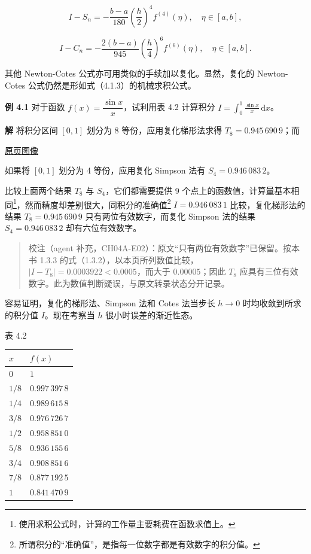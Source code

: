 \documentclass[
  10pt,
  fontset=fandol]{ctexart}
\newcounter{none} %
\begin{document}
\[
I-S_n=-\frac{b-a}{180}\left(\frac h2\right)^4f^{(4)}(\eta),\quad\eta\in[a,b],
\tag{4.2.13}
\]

\[
I-C_n=-\frac{2(b-a)}{945}\left(\frac h4\right)^6f^{(6)}(\eta),\quad\eta\in[a,b].
\tag{4.2.14}
\]

其他 Newton-Cotes 公式亦可用类似的手续加以复化。显然，复化的 Newton-Cotes 公式仍然是形如式（4.1.3）的机械求积公式。

\textbf{例 4.1} 对于函数 \(f(x)=\dfrac{\sin x}{x}\)，试利用表 4.2 计算积分 \(I=\displaystyle\int_0^1\frac{\sin x}{x}\,\mathrm{d}x\)。

\textbf{解} 将积分区间 \([0,1]\) 划分为 8 等份，应用复化梯形法求得 \(T_8=0.945\,690\,9\)；而

\href{../../source-images/pdf-100.jpeg}{原页图像}

如果将 \([0,1]\) 划分为 4 等份，应用复化 Simpson 法有 \(S_4=0.946\,083\,2\)。

比较上面两个结果 \(T_8\) 与 \(S_4\)，它们都需要提供 9 个点上的函数值，计算量基本相同\footnote{使用求积公式时，计算的工作量主要耗费在函数求值上。}，然而精度却差别很大，同积分的准确值\footnote{所谓积分的``准确值''，是指每一位数字都是有效数字的积分值。} \(I=0.946\,083\,1\) 比较，复化梯形法的结果 \(T_8=0.945\,690\,9\) 只有两位有效数字，而复化 Simpson 法的结果 \(S_4=0.946\,083\,2\) 却有六位有效数字。

\begin{quote}
校注（agent 补充，CH04A-E02）：原文``只有两位有效数字''已保留。按本书 1.3.3 的式（1.3.2），以本页所列数值比较，\(|I-T_8|=0.0003922<0.0005\)，而大于 \(0.00005\)；因此 \(T_8\) 应具有三位有效数字。此为数值判断疑误，与原文转录状态分开记录。
\end{quote}

容易证明，复化的梯形法、Simpson 法和 Cotes 法当步长 \(h\to0\) 时均收敛到所求的积分值 \(I\)。现在考察当 \(h\) 很小时误差的渐近性态。

表 4.2

{\def\LTcaptype{none} %
\begin{longtable}[]{@{}ll@{}}
\toprule\noalign{}
\(x\) & \(f(x)\) \\
\midrule\noalign{}
\endhead
\bottomrule\noalign{}
\endlastfoot
\(0\) & \(1\) \\
\(1/8\) & \(0.997\,397\,8\) \\
\(1/4\) & \(0.989\,615\,8\) \\
\(3/8\) & \(0.976\,726\,7\) \\
\(1/2\) & \(0.958\,851\,0\) \\
\(5/8\) & \(0.936\,155\,6\) \\
\(3/4\) & \(0.908\,851\,6\) \\
\(7/8\) & \(0.877\,192\,5\) \\
\(1\) & \(0.841\,470\,9\) \\
\end{longtable}
}
\end{document}
